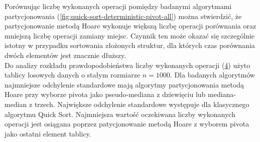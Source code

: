 Porównując liczbę wykonanych operacji pomiędzy badanymi algorytmami partycjonowania (\ref{fig:quick-sort-deterministic-pivot-all}) można stwierdzić, że partycjonowanie metodą Hoare wykonuje większą liczbę operacji porównania oraz mniejszą liczbę operacji zamiany miejsc. Czynnik ten może okazać się szczególnie istotny w przypadku sortowania złożonych struktur, dla których czas porównania dwóch elementów jest znacznie dłuższy.\\
 
Do analizy rozkładu prawdopodobieństwa liczby wykonanych operacji (\ref{fig:quick-sort-deterministic-pivot-density}) użyto tablicy losowych danych o stałym rozmiarze $n = 1000$. Dla badanych algorytmów najmniejsze odchylenie standardowe mają algorytmy partycjonowania metodą Hoare przy wyborze pivota jako pseudo-mediana z dziewięciu lub mediana-median z trzech. Największe odchylenie standardowe występuje dla klasycznego algorytmu Quick Sort. Najmniejsza wartość oczekiwana liczby wykonanych operacji jest osiągana poprzez patycjonowanie metodą Hoare z wyborem pivota jako ostatni element tablicy.


\begin{figure}[]
	\centering
	
	\caption[]{}
	\label{fig:quick-sort-deterministic-pivot-random}
\end{figure}

\begin{figure}[]
	\centering
	
	\caption[]{}
	\label{fig:quick-sort-deterministic-pivot-reversed}
\end{figure}

\begin{figure}[]
	\centering
	
	\caption[]{}
	\label{fig:quick-sort-deterministic-pivot-cost-factor}
\end{figure}

\begin{figure}[]
	\centering
	
	\caption[]{}
	\label{fig:quick-sort-deterministic-pivot-density}
\end{figure}

